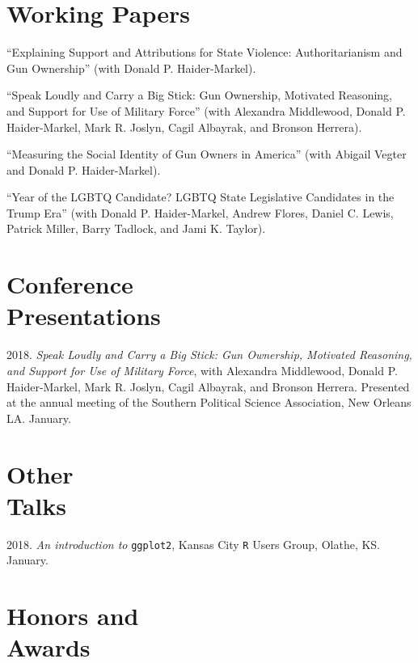 \documentclass[margin,line,pifont,palatino,courier]{res}
\begin{document}
\begin{resume}
\section{\sc Working Papers}

``Explaining Support and Attributions for State Violence:
Authoritarianism and Gun Ownership'' (with Donald P. Haider-Markel).

``Speak Loudly and Carry a Big Stick: Gun Ownership, Motivated
Reasoning, and Support for Use of Military Force'' (with Alexandra
Middlewood, Donald P. Haider-Markel, Mark R. Joslyn, Cagil Albayrak,
and Bronson Herrera).

``Measuring the Social Identity of Gun Owners in America'' (with
Abigail Vegter and Donald P. Haider-Markel).

``Year of the LGBTQ Candidate? LGBTQ State Legislative Candidates in
the Trump Era'' (with Donald P. Haider-Markel, Andrew Flores, Daniel
C. Lewis, Patrick Miller, Barry Tadlock, and Jami K. Taylor).

\section{\sc Conference \\ Presentations}

2018. \emph{Speak Loudly and Carry a Big Stick: Gun Ownership, Motivated
  Reasoning, and Support for Use of Military Force}, with Alexandra
Middlewood, Donald P. Haider-Markel, Mark R. Joslyn, Cagil Albayrak,
and Bronson Herrera. Presented at the annual meeting of the Southern
Political Science Association, New Orleans LA. January.

\section{\sc Other\\ Talks}

2018. \emph{An introduction to} \verb+ggplot2+, Kansas City \verb+R+ Users Group,
Olathe, KS. January.


\section{\sc Honors and\\ Awards}


\end{resume}
\end{document}
